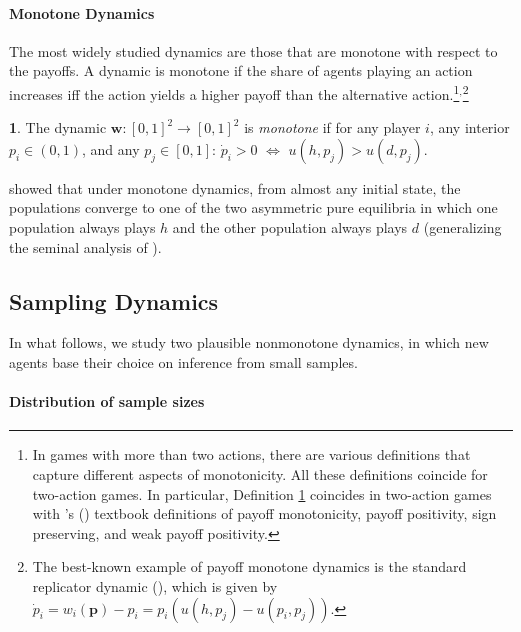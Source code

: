 \documentclass[12pt]{article}
\numberwithin{equation}{section}
\numberwithin{figure}{section}
\theoremstyle{definition}
\newtheorem{defn}{\protect\definitionname}
\theoremstyle{plain}
\theoremstyle{plain}
\theoremstyle{plain}
\theoremstyle{remark}
\theoremstyle{plain}
\theoremstyle{plain}
\providecommand{\definitionname}{Definition}
\begin{document}
\paragraph{Monotone Dynamics}
The most widely studied 
dynamics are those that are monotone with respect to the payoffs.
A dynamic is monotone if the share
of agents playing an action increases iff the action yields a higher
payoff than the alternative
action.\footnote{In games with more than two actions, there are various definitions that capture different aspects of monotonicity. All these definitions coincide for two-action games. In particular, Definition \ref{def-monotone} coincides in two-action games with \citeauthor{weibull1997evolutionary}'s (\citeyear[Section 5.5]{weibull1997evolutionary}) textbook definitions of payoff monotonicity, payoff positivity, sign preserving, and weak payoff positivity.}$^{,}$\footnote{The best-known example of payoff monotone dynamics is the standard
replicator dynamic (\citealp{taylor1979evolutionarily}), which is
given by
$\dot{p}_{i}=w_{i}\left(\textbf{p}\right)-p_{i}=p_{i}\left(u\left(h,p_{j}\right)-u\left(p_{i},p_{j}\right)\right).\label{eq:replicator-dynamics}$}
\begin{defn}\label{def-monotone}
The dynamic $\textbf{w}:\left[0,1\right]^{2}\rightarrow\left[0,1\right]^{2}$
is \emph{monotone} if for any player $i$, any interior $p_{i}\in\left(0,1\right)$,
and any $p_{j}\in\left[0,1\right]$: $\dot{p}_{i}>0\,\,\Leftrightarrow\,\,u\left(h,p_{j}\right)>u\left(d,p_{j}\right).$ 
\end{defn}

\cite{oprea2011separating} showed that under monotone dynamics, from almost any initial state, the populations converge to one of the two asymmetric pure equilibria in which one population always plays
$h$ and the other population always plays $d$ (generalizing the seminal analysis of \citealp{smith1976logic}). 

\subsection{Sampling Dynamics}
In what follows, 
we study two plausible nonmonotone dynamics, in which new agents base their choice on inference from small samples. 

\paragraph{Distribution of sample sizes}
\end{document}
